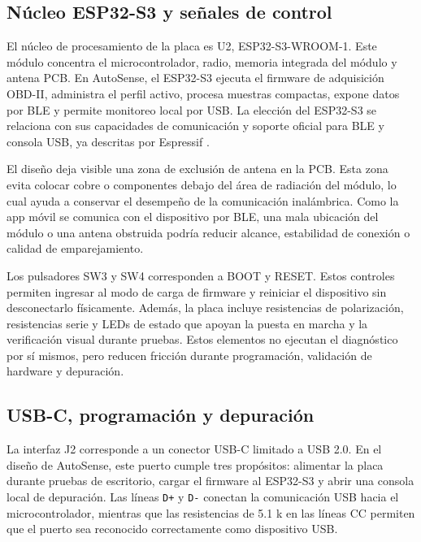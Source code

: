 \documentclass[12pt,letterpaper]{report}
\begin{document}
\subsection{Núcleo ESP32-S3 y señales de control}

El núcleo de procesamiento de la placa es U2, ESP32-S3-WROOM-1. Este módulo concentra el microcontrolador, radio, memoria integrada del módulo y antena PCB. En AutoSense, el ESP32-S3 ejecuta el firmware de adquisición OBD-II, administra el perfil activo, procesa muestras compactas, expone datos por BLE y permite monitoreo local por USB. La elección del ESP32-S3 se relaciona con sus capacidades de comunicación y soporte oficial para BLE y consola USB, ya descritas por Espressif \cite{espressif2026_esp32s3_get_started,espressif2026_esp32s3_ble_overview,espressif2026_esp32s3_usb_otg_console}.

El diseño deja visible una zona de exclusión de antena en la PCB. Esta zona evita colocar cobre o componentes debajo del área de radiación del módulo, lo cual ayuda a conservar el desempeño de la comunicación inalámbrica. Como la app móvil se comunica con el dispositivo por BLE, una mala ubicación del módulo o una antena obstruida podría reducir alcance, estabilidad de conexión o calidad de emparejamiento.

Los pulsadores SW3 y SW4 corresponden a BOOT y RESET. Estos controles permiten ingresar al modo de carga de firmware y reiniciar el dispositivo sin desconectarlo físicamente. Además, la placa incluye resistencias de polarización, resistencias serie y LEDs de estado que apoyan la puesta en marcha y la verificación visual durante pruebas. Estos elementos no ejecutan el diagnóstico por sí mismos, pero reducen fricción durante programación, validación de hardware y depuración.

\subsection{USB-C, programación y depuración}

La interfaz J2 corresponde a un conector USB-C limitado a USB 2.0. En el diseño de AutoSense, este puerto cumple tres propósitos: alimentar la placa durante pruebas de escritorio, cargar el firmware al ESP32-S3 y abrir una consola local de depuración. Las líneas \texttt{D+} y \texttt{D-} conectan la comunicación USB hacia el microcontrolador, mientras que las resistencias de 5.1 k en las líneas CC permiten que el puerto sea reconocido correctamente como dispositivo USB.
\end{document}
